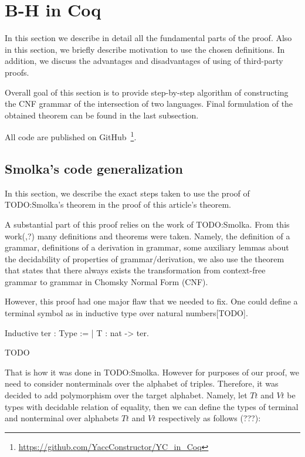 \section{B-H in Coq}


In this section we describe in detail all the fundamental parts of the proof. Also in this section, we briefly describe motivation to use the chosen definitions. In addition, we discuss the advantages and disadvantages of using of third-party proofs. 

Overall goal of this section is to provide step-by-step algorithm of constructing the CNF grammar of the intersection of two languages. Final formulation of the obtained theorem can be found in the last subsection. 

All code are published on GitHub~\footnote{\url{https://github.com/YaccConstructor/YC\_in\_Coq}}.
   
\subsection{ Smolka's code generalization}

In this section, we describe the exact steps taken to use the proof of TODO:Smolka's theorem in the proof of this article's theorem.

A substantial part of this proof relies on the work of TODO:Smolka. From this work(,?) many definitions and theorems were taken. Namely, the definition of a grammar, definitions of a derivation in grammar, some auxiliary lemmas about the decidability of properties of grammar/derivation, we also use the theorem that states that there always exists the transformation from context-free grammar to grammar in Chomsky Normal Form (CNF).

However, this proof had one major flaw that we needed to fix. One could define a terminal symbol as in inductive type over natural numbers[TODO].

\begin{listing}[h]
	\begin{pyglist}[language=coq, numbers=none, numbersep=5pt]
  Inductive ter : Type := | T : nat -> ter.
	\end{pyglist}
	\caption{TODO}
	\label{lst:verbments1}
\end{listing}

That is how it was done in TODO:Smolka. However for purposes of our proof, we need to consider nonterminals over the alphabet of triples. Therefore, it was decided to add polymorphism over the target alphabet. Namely, let $Tt$ and $Vt$ be types with decidable relation of equality, then we can define the types of terminal and nonterminal over alphabets $Tt$ and $Vt$ respectively as follows (???):


